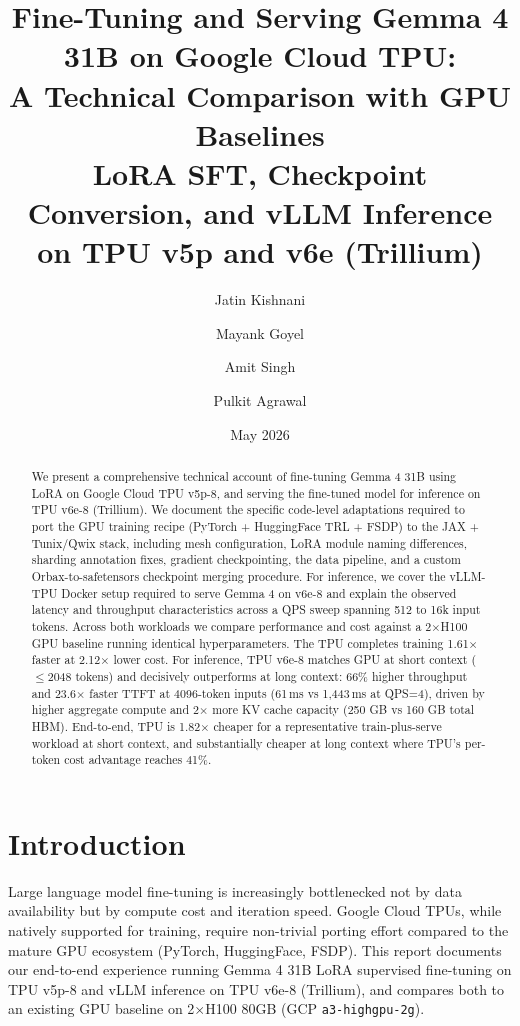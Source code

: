 \documentclass[11pt,a4paper]{article}
\title{\textbf{Fine-Tuning and Serving Gemma 4 31B on Google Cloud TPU:\\
A Technical Comparison with GPU Baselines}\\[0.5em]
\large LoRA SFT, Checkpoint Conversion, and vLLM Inference\\
on TPU v5p and v6e (Trillium)}
\author{Jatin Kishnani \and Mayank Goyel \and Amit Singh \and Pulkit Agrawal}
\date{May 2026}
\begin{document}
\maketitle
\thispagestyle{fancy}

\begin{abstract}
We present a comprehensive technical account of fine-tuning Gemma 4 31B using LoRA on Google Cloud TPU v5p-8, and serving the fine-tuned model for inference on TPU v6e-8 (Trillium). We document the specific code-level adaptations required to port the GPU training recipe (PyTorch + HuggingFace TRL + FSDP) to the JAX + Tunix/Qwix stack, including mesh configuration, LoRA module naming differences, sharding annotation fixes, gradient checkpointing, the data pipeline, and a custom Orbax-to-safetensors checkpoint merging procedure. For inference, we cover the vLLM-TPU Docker setup required to serve Gemma 4 on v6e-8 and explain the observed latency and throughput characteristics across a QPS sweep spanning 512 to 16k input tokens. Across both workloads we compare performance and cost against a 2$\times$H100 GPU baseline running identical hyperparameters. The TPU completes training 1.61$\times$ faster at 2.12$\times$ lower cost. For inference, TPU v6e-8 matches GPU at short context ($\leq$2048 tokens) and decisively outperforms at long context: 66\% higher throughput and 23.6$\times$ faster TTFT at 4096-token inputs (61\,ms vs 1,443\,ms at QPS=4), driven by higher aggregate compute and 2$\times$ more KV cache capacity (250 GB vs 160 GB total HBM). End-to-end, TPU is 1.82$\times$ cheaper for a representative train-plus-serve workload at short context, and substantially cheaper at long context where TPU's per-token cost advantage reaches 41\%.
\end{abstract}

\tableofcontents
\newpage

\section{Introduction}

Large language model fine-tuning is increasingly bottlenecked not by data availability but by compute cost and iteration speed. Google Cloud TPUs, while natively supported for training, require non-trivial porting effort compared to the mature GPU ecosystem (PyTorch, HuggingFace, FSDP). This report documents our end-to-end experience running Gemma 4 31B LoRA supervised fine-tuning on TPU v5p-8 and vLLM inference on TPU v6e-8 (Trillium), and compares both to an existing GPU baseline on 2$\times$H100 80GB (GCP \texttt{a3-highgpu-2g}).
\end{document}

